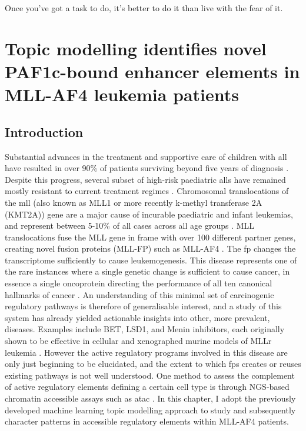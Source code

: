 \begin{savequote}[8cm]
    Once you've got a task to do, it's better to do it than live with the fear of it.
\end{savequote}

\chapter{Topic modelling identifies novel PAF1c-bound enhancer elements in MLL-AF4 leukemia patients}

\minitoc


\section{Introduction} \label{ch5:intro}

Substantial advances in the treatment and supportive care of children with \gls{all} have resulted in over 90\% of patients surviving beyond five years of diagnosis \cite{Inaba2021}. Despite this progress, several subset of high-risk paediatric \glspl{all} have remained mostly resistant to current treatment regimes \cite{Inaba2021}. Chromosomal translocations of the \gls{mll} (also known as MLL1 or more recently k-methyl transferase 2A (KMT2A)) gene are a major cause of incurable paediatric and infant leukemias, and represent between 5-10\% of \gls{all} cases across all age groups \cite{Rice2020b}. MLL translocations fuse the MLL gene in frame with over 100 different partner genes, creating novel fusion proteins (MLL-FP) such as MLL-AF4 \cite{Meyer2017}. The \gls{fp} changes the transcriptome sufficiently to cause leukemogenesis.  This disease represents one of the rare instances where a single genetic change is sufficient to cause cancer, in essence a single oncoprotein directing the performance of all ten canonical hallmarks of cancer \cite{Rao2015,Hanahan2011}. An understanding of this minimal set of carcinogenic regulatory pathways is therefore of generalisable interest, and a study of this system has already yielded actionable insights into other, more prevalent, diseases. Examples include BET, LSD1, and Menin inhibitors, each originally shown to be effective in cellular and xenographed murine models of MLLr leukemia \cite{Issa2021,Fang2019,Shorstova2021,Abedin2016}. However the active regulatory programs involved in this disease are only just beginning to be elucidated, and the extent to which \glspl{fp} creates or reuses existing pathways is not well understood. One method to assess the complement of active regulatory elements defining a certain cell type is through NGS-based chromatin accessible assays such as \gls{atac} \cite{Minnoye2021, Liu2020}. In this chapter, I adopt the previously developed machine learning topic modelling approach to study and subsequently character patterns in accessible regulatory elements within MLL-AF4 patients.  

